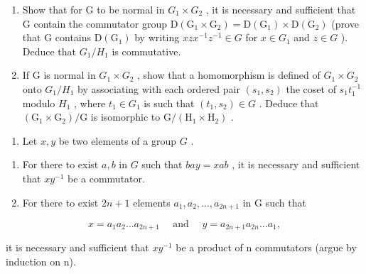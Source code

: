 \begin{enumerate}
\def\labelenumi{(\alph{enumi})}
\item
  Show that for G to be normal in \(G_{1} \times G_{2}\) , it is necessary and sufficient that G contain the commutator group \(\mathrm{D}(\mathrm{G}_{1} \times \mathrm{G}_{2}) = \mathrm{D}(\mathrm{G}_{1}) \times \mathrm{D}(\mathrm{G}_{2})\) (prove that G contains \(\mathrm{D}(\mathrm{G}_{1})\) by writing \(xzx^{-1}z^{-1} \in G\) for \(x \in G_{1}\) and \(z \in G\) ). Deduce that \(G_{1}/H_{1}\) is commutative.
\item
  If G is normal in \(G_{1} \times G_{2}\) , show that a homomorphism is defined of \(G_{1} \times G_{2}\) onto \(G_{1}/H_{1}\) by associating with each ordered pair \((s_{1}, s_{2})\) the coset of \(s_{1}t_{1}^{-1}\) modulo \(H_{1}\) , where \(t_{1} \in G_{1}\) is such that \((t_{1}, s_{2}) \in G\) . Deduce that \((\mathrm{G}_{1} \times \mathrm{G}_{2})/\mathrm{G}\) is isomorphic to \(\mathrm{G}/(\mathrm{H}_{1} \times \mathrm{H}_{2})\) .
\end{enumerate}

\begin{enumerate}
\def\labelenumi{\arabic{enumi}.}
\setcounter{enumi}{40}
\tightlist
\item
  Let \(x, y\) be two elements of a group \(G\) .
\end{enumerate}

\begin{enumerate}
\def\labelenumi{(\alph{enumi})}
\item
  For there to exist \(a, b\) in \(G\) such that \(bay = xab\) , it is necessary and sufficient that \(xy^{-1}\) be a commutator.
\item
  For there to exist \(2n + 1\) elements \(a_1, a_2, \ldots, a_{2n+1}\) in G such that
\end{enumerate}

\[
x = a _ {1} a _ {2} \dots a _ {2 n + 1} \quad \text { and } \quad y = a _ {2 n + 1} a _ {2 n} \dots a _ {1},
\]

it is necessary and sufficient that \(xy^{-1}\) be a product of n commutators (argue by induction on n).
\relax{}
